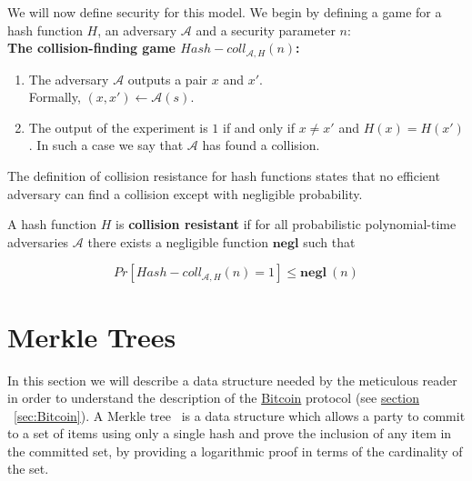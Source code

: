 We will now define security for this model. We begin by defining a game for a hash function $H$, an adversary $\mathcal{A}$ and a security parameter $n$:
\\

\textbf{The collision-finding game ${Hash-coll}_{\mathcal{A},H}(n)$:} \cite{Katz:2007:IMC:1206501}
\begin{enumerate}
  \item The adversary $\mathcal{A}$ outputs a pair $x$ and $x'$. \\
  Formally, $(x,x') \leftarrow \mathcal{A}(s)$.
  \item The output of the experiment is $1$ if and only if $x \neq x'$ and $H(x) = H(x')$. In such a case we say that $\mathcal{A}$ has found a collision.
\end{enumerate}
%
The definition of collision resistance for hash functions states that no efficient adversary can find a collision except with negligible probability.
%
\begin{definition} \textnormal{\cite{Katz:2007:IMC:1206501}}
  A hash function $H$ is \textbf{collision resistant} if for all probabilistic polynomial-time adversaries $\mathcal{A}$ there exists a negligible function $\textbf{negl}$ such that

\begin{equation} \label{eqn:collision}
  Pr[{Hash-coll}_{\mathcal{A},H}(n) = 1] \leq \textbf{negl} \: (n)
\end{equation}
\end{definition}
%
%
\section{Merkle Trees} \label{sec:merkle-trees}
In this section we will describe a data structure needed by the meticulous reader in order to understand the description of the \hyperref[sec:Bitcoin]{Bitcoin} protocol (see \hyperref[sec:Bitcoin]{section }~\ref{sec:Bitcoin}).
A Merkle tree~\cite{merkle} is a data structure which allows a party to commit to a set of items using only a single hash and prove the inclusion of any item in the committed set, by providing a logarithmic proof in terms of the cardinality of the set.

